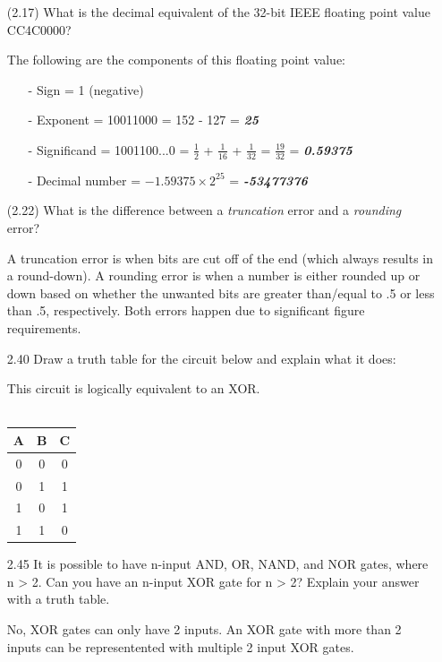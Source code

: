 \documentclass[letterpaper,10pt,titlepage]{article}
\begin{document}
\begin{enumerate}
\item[(2.17)] What is the decimal equivalent of the 32-bit IEEE floating point value
	CC4C0000?
  \item[\textbullet] The following are the components of this floating point value:
  \begin{enumerate}
    \item[-] Sign = 1 (negative)
    \item[-] Exponent = 10011000 = 152 - 127 = {\large\textit{\textbf{25}}}
    \item[-] Significand = 1001100...0 = $\frac{1}{2}$ + $\frac{1}{16}$ + $\frac{1}{32}$ =
	    $\frac{19}{32}$ = {\large\textit{\textbf{0.59375}}}
    \item[-] Decimal number = $-1.59375 \times 2^{25}$ =
	    {\large\textit{\textbf{-53477376}}} 
  \end{enumerate}

\item[(2.22)] What is the difference between a \textit{truncation} error and a
	\textit{rounding} error?
  \item[\textbullet] A truncation error is when bits are cut off of the end (which always
	results in a round-down). A rounding error is when a number is either rounded up
	or down based on whether the unwanted bits are greater than/equal to .5 or less
	than .5, respectively. Both errors happen due to significant figure requirements.

\item[2.40] Draw a truth table for the circuit below and explain what it does:
  \item[\textbullet] This circuit is logically equivalent to an XOR. \\
    \\
    \begin{tabular}{ c c | c }
	    A & B & C \\
	    \hline
	    0 & 0 & 0 \\
	    0 & 1 & 1 \\
	    1 & 0 & 1 \\
	    1 & 1 & 0 \\
    \end{tabular}

\item[2.45] It is possible to have n-input AND, OR, NAND, and NOR gates, where n > 2. Can
	you have an n-input XOR gate for n > 2? Explain your answer with a truth table.
  \item[\textbullet] No, XOR gates can only have 2 inputs. An XOR gate with more than 2
	  inputs can be representented with multiple 2 input XOR gates.

\end{enumerate}
\end{document}
